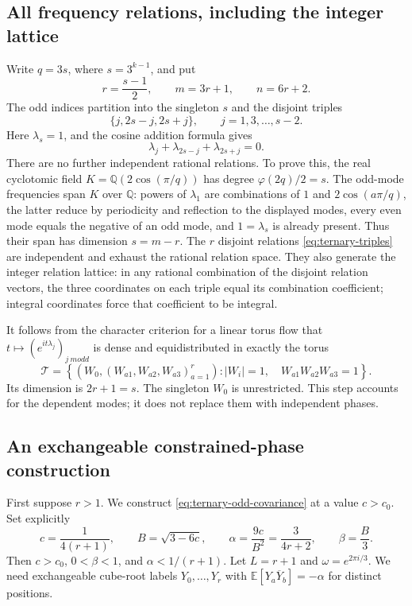 \documentclass[11pt,a4paper]{article}
\theoremstyle{definition}\newtheorem{definition}[theorem]{Definition}
\theoremstyle{remark}\newtheorem{remark}[theorem]{Remark}
\begin{document}
\subsection{All frequency relations, including the integer lattice}
Write $q=3s$, where $s=3^{k-1}$, and put
\[
 r=\frac{s-1}{2},\qquad m=3r+1,\qquad n=6r+2.
\]
The odd indices partition into the singleton $s$ and the disjoint triples
\[
 \{j,2s-j,2s+j\},\qquad j=1,3,\ldots,s-2.
\]
Here $\lambda_s=1$, and the cosine addition formula gives
\begin{equation}\label{eq:ternary-triples}
 \lambda_j+\lambda_{2s-j}+\lambda_{2s+j}=0.
\end{equation}
There are no further independent rational relations. To prove this,
the real cyclotomic field
\(K=\mathbb Q(2\cos(\pi/q))\) has degree
\(\varphi(2q)/2=s\). The odd-mode frequencies span $K$ over
$\mathbb Q$: powers of $\lambda_1$ are combinations of $1$ and
$2\cos(a\pi/q)$, the latter reduce by periodicity and reflection to
the displayed modes, every even mode equals the negative of an odd
mode, and $1=\lambda_s$ is already present. Thus their span has
dimension $s=m-r$. The $r$ disjoint relations
\eqref{eq:ternary-triples} are independent and exhaust the rational
relation space. They also generate the integer relation lattice:
in any rational combination of the disjoint relation vectors, the
three coordinates on each triple equal its combination coefficient;
integral coordinates force that coefficient to be integral.

It follows from the character criterion for a linear torus flow that
\(t\mapsto(e^{it\lambda_j})_{j\ {
m odd}}\) is dense and
equidistributed in exactly the torus
\begin{equation}\label{eq:ternary-torus}
 \mathcal T=\left\{(W_0,(W_{a1},W_{a2},W_{a3})_{a=1}^r):
 |W_i|=1,\quad W_{a1}W_{a2}W_{a3}=1\right\}.
\end{equation}
Its dimension is $2r+1=s$. The singleton $W_0$ is unrestricted.
This step accounts for the dependent modes; it does not replace them
with independent phases.

\subsection{An exchangeable constrained-phase construction}
First suppose $r>1$. We construct \eqref{eq:ternary-odd-covariance}
at a value $c>c_0$. Set explicitly
\[
 c=\frac1{4(r+1)},\qquad
 B=\sqrt{3-6c},\qquad
 \alpha=\frac{9c}{B^2}=\frac3{4r+2},\qquad \beta=\frac B3.
\]
Then $c>c_0$, $0<\beta<1$, and
\(\alpha<1/(r+1)\). Let $L=r+1$ and
$\omega=e^{2\pi i/3}$. We need exchangeable cube-root labels
$Y_0,\ldots,Y_r$ with
\(\mathbb E[Y_a\overline Y_b]=-\alpha\) for distinct positions.
\end{document}
